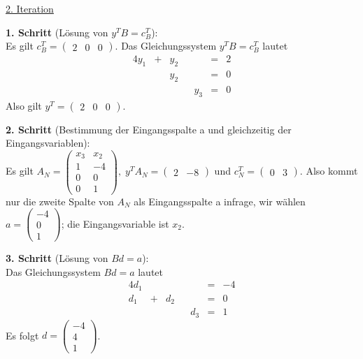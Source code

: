 \documentclass[10pt,a4paper,oneside,ngerman,numbers=noenddot]{scrartcl}
\begin{document}
		\underline{2. Iteration}
		
		\textbf{1. Schritt} (Lösung von $y^{T}B = c_{B}^{T}$):\\
		Es gilt $c_{B}^{T} = \begin{pmatrix} 2 & 0 & 0 \end{pmatrix}$. Das Gleichungssystem $y^{T}B = c_{B}^{T}$ lautet
		\begin{alignat*}{4}
			y_{1} &+& y_{2} && &=& 2 \\
			&& y_{2} && &=& 0 \\
			&& && y_{3} &=& 0
		\end{alignat*}
		Also gilt $y^{T} = \begin{pmatrix} 2 & 0 & 0 \end{pmatrix}$.
		
		\textbf{2. Schritt} (Bestimmung der Eingangsspalte a und gleichzeitig der Eingangsvariablen):\\
		Es gilt $A_{N} = \begin{pmatrix} x_{3} & x_{2} \\ 1 & -4 \\ 0 & 0 \\ 0 & 1 \end{pmatrix},\; y^{T}A_{N} = \begin{pmatrix} 2 & -8 \end{pmatrix}$ und $c_{N}^{T} = \begin{pmatrix} 0 & 3 \end{pmatrix}$. Also kommt nur die zweite Spalte von $A_{N}$ als Eingangsspalte a infrage, wir wählen $a = \begin{pmatrix} -4 \\ 0 \\ 1 \end{pmatrix}$; die Eingangsvariable ist $x_{2}$.
		
		\textbf{3. Schritt} (Lösung von $Bd = a$):\\
		Das Gleichungssystem $Bd = a$ lautet
		\begin{alignat*}{4}
			d_{1} && && &=& -4 \\
			d_{1} &+& d_{2} && &=& 0 \\
			&& && d_{3} &=& 1
		\end{alignat*}
		Es folgt $d = \begin{pmatrix}-4 \\ 4 \\ 1 \end{pmatrix}$.
		
\end{document}
